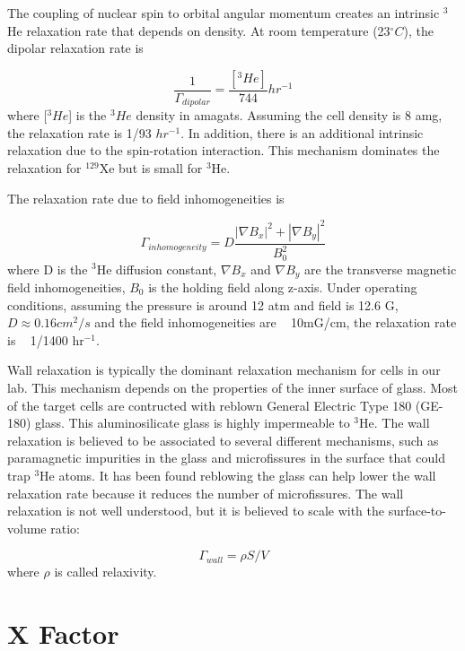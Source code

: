 The coupling of nuclear spin to orbital angular momentum creates an intrinsic $^{3}$He relaxation rate that depends on density. At room temperature (23$^{\circ}C$), the dipolar relaxation rate is~\cite{PhysRevLett.67.3219} 

\begin{equation}
\frac{1}{\Gamma_{dipolar}}=\frac{[^{3}He]}{744}hr^{-1}
\end{equation}
where [$^{3}He$] is the $^{3}He$ density in amagats. Assuming the cell density is 8 amg, the relaxation rate is 1/93 $hr^{-1}$. In addition, there is an additional intrinsic relaxation due to the spin-rotation interaction. This mechanism dominates the relaxation for $^{129}$Xe but is small for $^{3}$He. 

The relaxation rate due to field inhomogeneities is~\cite{PhysRev.138.A946, PhysRev.139.A1398, PhysRevA.37.2877}

\begin{equation}
\Gamma_{inhomogeneity} = D\frac{|\nabla B_{x}|^{2}+|\nabla B_{y}|^{2}}{B_{0}^{2}}
\end{equation}
where D is the $^{3}$He diffusion constant, $\nabla B_{x}$ and $\nabla B_{y}$ are the transverse magnetic field inhomogeneities, $B_{0}$ is the holding field along z-axis. Under operating conditions, assuming the pressure is around 12 atm and field is 12.6 G, $D\approx 0.16cm^{2}/s$ and the field inhomogeneities are ~ 10mG/cm, the relaxation rate is ~ 1/1400 hr$^{-1}$.

Wall relaxation is typically the dominant relaxation mechanism for cells in our lab. This mechanism depends on the properties of the inner surface of glass. Most of the target cells are contructed with reblown General Electric Type 180 (GE-180) glass. This aluminosilicate glass is highly impermeable to $^{3}$He. The wall relaxation is believed to be associated to several different mechanisms, such as paramagnetic impurities in the glass and microfissures in the surface that could trap $^{3}$He atoms. It has been found reblowing the glass can help lower the wall relaxation rate because it reduces the number of microfissures. The wall relaxation is not well understood, but it is believed to scale with the surface-to-volume ratio:

\begin{equation}
\Gamma_{wall} = \rho S/V
\end{equation}
where $\rho$ is called relaxivity.

\section{X Factor}

